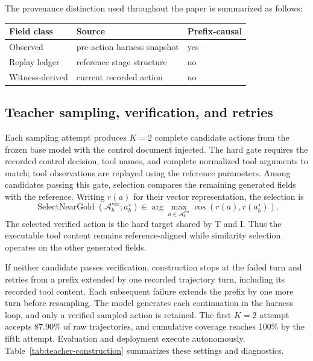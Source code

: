 \documentclass{article}
\begin{document}
The provenance distinction used throughout the paper is summarized as follows:
\begin{center}
\begin{tabular}{@{}lll@{}}
\toprule
Field class & Source & Prefix-causal \\
\midrule
Observed & pre-action harness snapshot & yes \\
Replay ledger & reference stage structure & no \\
Witness-derived & current recorded action & no \\
\bottomrule
\end{tabular}
\end{center}

\subsection{Teacher sampling, verification, and retries}
\label{app:teacher-construction}

Each sampling attempt produces $K=2$ complete candidate actions from the
frozen base model with the control document injected. The hard gate requires
the recorded control decision, tool names, and complete normalized tool
arguments to match; tool observations are replayed using the reference
parameters. Among candidates passing this gate, selection compares the
remaining generated fields with the reference. Writing $r(a)$ for their
vector representation, the selection is
\begin{equation}
\operatorname{SelectNearGold}(\mathcal A_b^{\mathrm{ver}};a_b^\star)
\in\arg\max_{a\in\mathcal A_b^{\mathrm{ver}}}
\operatorname{cos}\!\left(r(a),r(a_b^\star)\right).
\end{equation}
The selected verified action is the hard target shared by T and I. Thus the
executable tool content remains reference-aligned while similarity selection
operates on the other generated fields.

If neither candidate passes verification, construction stops at the failed
turn and retries from a prefix extended by one recorded trajectory turn,
including its recorded tool content. Each subsequent failure extends the
prefix by one more turn before resampling. The model generates each
continuation in the harness loop, and only a verified sampled action is
retained. The first $K=2$ attempt accepts 87.90\% of raw
trajectories, and cumulative coverage reaches 100\% by the fifth attempt.
Evaluation and deployment execute autonomously.
Table~\ref{tab:teacher-construction} summarizes these settings and diagnostics.
\end{document}

